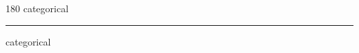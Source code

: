 
\begin{frame}
\begin{center}
\begin{turn}{180}
{\fontsize{2.5cm}{1em}\selectfont categorical}
\end{turn}
\vspace{1em}\par  
\hrule
\vspace{1em}\par  
{\fontsize{2.5cm}{1em}\selectfont categorical}
\end{center}
\end{frame}
